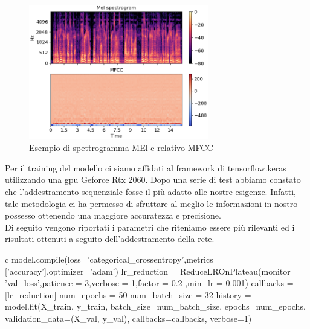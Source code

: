\documentclass[12pt, a4paper]{article}
\begin{document}
\begin{figure}[h]
    \centering
    \includegraphics[width=0.7\textwidth]{librosa-feature-mfcc-1_00.png}
    \caption{Esempio di spettrogramma MEl e relativo MFCC }
\end{figure} 
\newpage
Per il training del modello ci siamo affidati al framework di tensorflow.keras utilizzando una gpu Geforce Rtx 2060. Dopo una serie di test abbiamo constato che l'addestramento sequenziale fosse il più adatto alle nostre esigenze. Infatti, tale metodologia ci ha permesso di sfruttare al meglio le informazioni in nostro possesso ottenendo una maggiore accuratezza e precisione.\\
Di seguito vengono riportati i parametri che riteniamo essere più rilevanti ed i risultati ottenuti a seguito dell'addestramento della rete. 
\begin{code}
\label{code:python-code}
\begin{pythoncode}{c}
model.compile(loss='categorical_crossentropy',metrics=['accuracy'],optimizer='adam')
lr_reduction = ReduceLROnPlateau(monitor = 'val_loss',patience = 3,verbose = 1,factor = 0.2
                                ,min_lr = 0.001)
callbacks = [lr_reduction]
num_epochs = 50
num_batch_size = 32
history = model.fit(X_train,
          y_train,
          batch_size=num_batch_size,
          epochs=num_epochs,
          validation_data=(X_val, y_val),
          callbacks=callbacks,
          verbose=1)
\end{pythoncode}
\end{code}


\newpage


\end{document}
